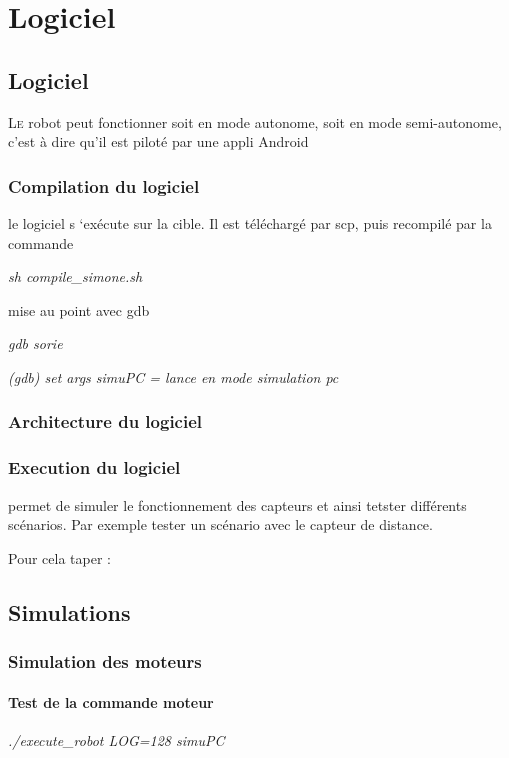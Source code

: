 \newpage

\chapter{Logiciel}
\section{Logiciel}
\lettrine[lines=1]{L}e robot peut fonctionner soit en mode autonome, soit en mode semi-autonome, c'est à dire qu'il est piloté par une appli Android


\subsection{Compilation du logiciel}



le logiciel s ‘exécute sur la cible. Il est téléchargé par scp, puis recompilé par la commande

\textit{sh compile\_simone.sh}



mise au point avec gdb

\textit{gdb sorie}

\textit{(gdb) set args simuPC = lance en mode simulation pc}



\subsection{Architecture  du logiciel}


\subsection{Execution du logiciel}





permet de simuler le fonctionnement des capteurs et ainsi tetster différents scénarios. Par exemple tester un scénario avec le capteur de distance.

Pour cela taper :

\section{Simulations}

\subsection{Simulation des moteurs}

\subsubsection{Test de la commande moteur}

\textit{./execute\_robot LOG=128 simuPC }

 